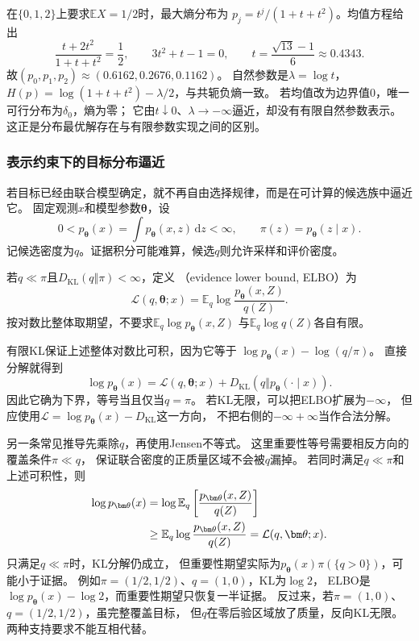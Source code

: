 在\(\{0,1,2\}\)上要求\(\mathbb EX=1/2\)时，最大熵分布为
\(p_j=t^j/(1+t+t^2)\)。均值方程给出
\[
  \frac{t+2t^2}{1+t+t^2}=\frac12,\qquad
  3t^2+t-1=0,\qquad
  t=\frac{\sqrt{13}-1}{6}\approx0.4343.
\]
故\((p_0,p_1,p_2)\approx(0.6162,0.2676,0.1162)\)。
自然参数是\(\lambda=\log t\)，
\(H(p)=\log(1+t+t^2)-\lambda/2\)，与共轭负熵一致。
若均值改为边界值\(0\)，唯一可行分布为\(\delta_0\)，熵为零；
它由\(t\downarrow0\)、\(\lambda\to-\infty\)逼近，却没有有限自然参数表示。
这正是分布最优解存在与有限参数实现之间的区别。

\subsubsection{表示约束下的目标分布逼近}
\label{sec:information-elbo-approximation}

若目标已经由联合模型确定，就不再自由选择规律，而是在可计算的候选族中逼近它。
固定观测\(x\)和模型参数\(\bm\theta\)，设
\[
  0<p_{\bm\theta}(x)=\int p_{\bm\theta}(x,z)\,\mathrm dz<\infty,
  \qquad
  \pi(z)=p_{\bm\theta}(z\mid x).
\]
记候选密度为\(q\)。证据积分可能难算，候选\(q\)则允许采样和评价密度。

\begin{definition}[证据下界]
\label{def:information-elbo}
若\(q\ll\pi\)且\(D_{\mathrm{KL}}(q\Vert\pi)<\infty\)，定义
（evidence lower bound, ELBO）为
\[
  \mathcal L(q,\bm\theta;x)
  =\mathbb E_q\log\frac{p_{\bm\theta}(x,Z)}{q(Z)}.
\]
按对数比整体取期望，不要求\(\mathbb E_q\log p_{\bm\theta}(x,Z)\)
与\(\mathbb E_q\log q(Z)\)各自有限。
\end{definition}

有限KL保证上述整体对数比可积，因为它等于
\(\log p_{\bm\theta}(x)-\log(q/\pi)\)。
直接分解就得到
\begin{equation}
  \log p_{\bm\theta}(x)
  =\mathcal L(q,\bm\theta;x)+D_{\mathrm{KL}}(q\Vert p_{\bm\theta}(\cdot\mid x)).
  \label{eq:information-elbo-decomposition}
\end{equation}
因此它确为下界，等号当且仅当\(q=\pi\)。
若KL无限，可以把ELBO扩展为\(-\infty\)，
但应使用\(\mathcal L=\log p_{\bm\theta}(x)-D_{\mathrm{KL}}\)这一方向，
不把右侧的\(-\infty+\infty\)当作合法分解。

另一条常见推导先乘除\(q\)，再使用Jensen不等式。
这里重要性等号需要相反方向的覆盖条件\(\pi\ll q\)，
保证联合密度的正质量区域不会被\(q\)漏掉。
若同时满足\(q\ll\pi\)和上述可积性，则
\begin{align}
  \log p_{\bm\theta}(x)
  &=\log\mathbb E_q\left[\frac{p_{\bm\theta}(x,Z)}{q(Z)}\right]\notag\\
  &\geq\mathbb E_q\log\frac{p_{\bm\theta}(x,Z)}{q(Z)}
   =\mathcal L(q,\bm\theta;x).
  \label{eq:information-elbo-jensen}
\end{align}
只满足\(q\ll\pi\)时，KL分解仍成立，
但重要性期望实际为\(p_{\bm\theta}(x)\pi(\{q>0\})\)，可能小于证据。
例如\(\pi=(1/2,1/2)\)、\(q=(1,0)\)，KL为\(\log2\)，
ELBO是\(\log p_{\bm\theta}(x)-\log2\)，而重要性期望只恢复一半证据。
反过来，若\(\pi=(1,0)\)、\(q=(1/2,1/2)\)，虽完整覆盖目标，
但\(q\)在零后验区域放了质量，反向KL无限。两种支持要求不能互相代替。

